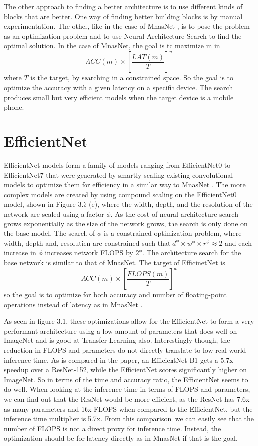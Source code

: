 The other approach to finding a better architecture is to use different kinds of blocks that are better. One way of finding better building blocks is by manual experimentation. The other, like in the case of MnasNet \citep{mnas}, is to pose the problem as an optimization problem and to use Neural Architecture Search \citep{neuralSearch} to find the optimal solution. In the case of MnasNet, the goal is to maximize m in \[ACC(m) \times [\frac{LAT(m)}{T}]^w \] \noindent where ${T}$ is the target, by searching in a constrained space. So the goal is to optimize the accuracy with a given latency on a specific device. The search produces small but very efficient models when the target device is a mobile phone.

\section{EfficientNet}
EfficientNet models form a family of models ranging from EfficientNet0 to EfficientNet7 that were generated by smartly scaling existing convolutional models to optimize them for efficiency in a similar way to MnasNet \citep{efficientNet}. 
The more complex models are created by using compound scaling on the EfficientNet0 model, shown in Figure 3.3 (e),  where the width, depth, and the resolution of the network are scaled using a factor ${\phi}$. 
As the cost of neural architecture search grows exponentially as the size of the network grows, the search is only done on the base model. 
The search of ${\phi}$ is a constrained optimization problem, where width, depth and, resolution are constrained such that ${d^\phi \times w^\phi \times r^\phi \approx 2}$ and each increase in ${\phi}$ increases network FLOPS by ${2^\phi}$. 
The architecture search for the base network is similar to that of MnasNet. The target of EfficinetNet is  \[ACC(m) \times [\frac{FLOPS(m)}{T}]^w\] \noindent so the goal is to optimize for both accuracy and number of floating-point operations instead of latency as in MnasNet \citep{efficientNet}. 

As seen in figure 3.1, these optimizations allow for the EfficientNet to form a very performant architecture using a low amount of parameters that does well on ImageNet and is good at Transfer Learning also. Interestingly though, the reduction in FLOPS and parameters do not directly translate to low real-world inference time. As is compared in the paper, an EfficientNet-B1 gets a 5.7x speedup over a ResNet-152, while the EfficientNet scores significantly higher on ImageNet. So in terms of the time and accuracy ratio, the EfficientNet seems to do well. When looking at the inference time in terms of FLOPS and parameters, we can find out that the ResNet would be more efficient, as the ResNet has 7.6x as many parameters and 16x FLOPS when compared to the EfficientNet, but the inference time multiplier is 5.7x. From this comparison, we can easily see that the number of FLOPS is not a direct proxy for inference time. 
Instead, the optimization should be for latency directly as in MnasNet if that is the goal.

